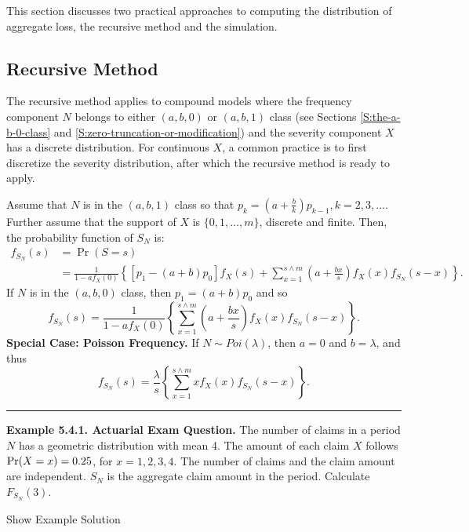 \documentclass[]{book}
\theoremstyle{definition}
\theoremstyle{definition}
\theoremstyle{definition}
\theoremstyle{remark}
\begin{document}
This section discusses two practical approaches to computing the
distribution of aggregate loss, the recursive method and the simulation.

\subsection{Recursive Method}\label{recursive-method}

The recursive method applies to compound models where the frequency
component \(N\) belongs to either \((a,b,0)\) or \((a,b,1)\) class (see
Sections \ref{S:the-a-b-0-class} and
\ref{S:zero-truncation-or-modification}) and the severity component
\(X\) has a discrete distribution. For continuous \(X\), a common
practice is to first discretize the severity distribution, after which
the recursive method is ready to apply.

Assume that \(N\) is in the \((a,b,1)\) class so that
\(p_{k}=\left( a+\frac{b}{k} \right) p_{k-1}, k = 2,3,\ldots\). Further
assume that the support of \(X\) is \(\{0,1,\ldots,m\}\), discrete and
finite. Then, the probability function of \(S_N\) is: \[\begin{aligned}
f_{S_N}(s)&=\Pr (S=s) \\
&=\frac{1}{1-af_{X}(0)}\left\{ \left[ p_1 -(a+b)p_{0}\right]
f_X (s)+\sum_{x=1}^{s\wedge m}\left( a+\frac{bx}{s} \right) f_X (x)f_{S_N}(s-x)\right\}.
\end{aligned}\] If \(N\) is in the \((a,b,0)\) class, then
\(p_1=(a+b)p_0\) and so \[
f_{S_N}(s)=\frac{1}{1-af_X (0)}\left\{ \sum_{x=1}^{s\wedge m}\left( a+\frac{bx
}{s}\right) f_X (x)f_{S_N}(s-x)\right\}.
\] \textbf{Special Case: Poisson Frequency.} If \(N \sim Poi(\lambda)\),
then \(a=0\) and \(b=\lambda\), and thus \[
f_{S_N}(s)=\frac{\lambda }{s}\left\{ \sum_{x=1}^{s \wedge
m} x f_X (x) f_{S_N} (s-x)\right\} .
\]

\begin{center}\rule{0.5\linewidth}{\linethickness}\end{center}

\textbf{Example 5.4.1. Actuarial Exam Question.} The number of claims in
a period \(N\) has a geometric distribution with mean 4. The amount of
each claim \(X\) follows \({\rm Pr} (X = x) = 0.25\), for
\(x = 1,2,3,4\). The number of claims and the claim amount are
independent. \(S_N\) is the aggregate claim amount in the period.
Calculate \(F_{S_N}(3)\).

Show Example Solution
\end{document}
